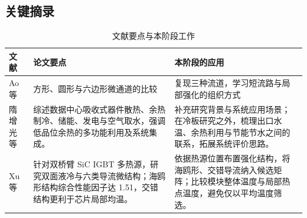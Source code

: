 \documentclass[stage1,fontset=fandol]{ydzjreport}
\begin{document}
	\subsection{关键摘录}
	
	

	\begin{table}[H]
	  \centering
	  \small
	  \renewcommand{\arraystretch}{1.12}
	  \caption{文献要点与本阶段工作}
	  \label{tab:notes}
	  \begin{tabularx}{\textwidth}{@{}>{\RaggedRight\arraybackslash}p{} Y Y@{}}
	    \toprule
	     文献 & 论文要点 & 本阶段的应用 \\
	    \midrule
	    Ao 等\cite{ao} & 方形、圆形与六边形微通道的比较 & 复现三种流道，学习短流路与局部强化的组织方式 \\[3pt]
	    隋增光等\cite{ref1} & 综述数据中心吸收式器件散热、余热制冷、储能、发电与空气取水，强调低品位余热的多功能利用及系统集成。 & 补充研究背景与系统应用场景；在冷板研究之外，梳理出口水温、余热利用与节能节水之间的联系，拓展系统评价思路。 \\[3pt]
	    Xu 等\cite{ref2} & 针对双桥臂 SiC IGBT 多热源，研究双面液冷与六类导流微结构；海鸥形结构综合性能因子达 1.51，交错结构更利于芯片局部均温。 & 依据热源位置布置强化结构，将海鸥形、交错导流纳入候选矩阵；比较模块整体温度与局部热点温度，避免仅以平均温度筛选。 \\[3pt]

	    \bottomrule
	  \end{tabularx}
	\end{table}
\end{document}
